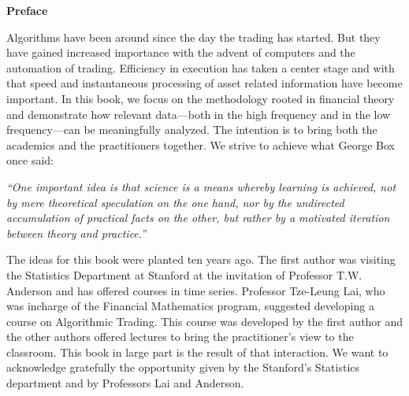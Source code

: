 \begin{center} {\large\bfseries Preface} \end{center}


Algorithms have been around since the day the trading has started. But they have gained increased importance with the advent of computers and the automation of trading. Efficiency in execution has taken a center stage and with that speed and instantaneous processing of asset related information have become important. In this book, we focus on the methodology rooted in financial theory and demonstrate how relevant data---both in the high frequency and in the low frequency---can be meaningfully analyzed. The intention is to bring both the academics and the practitioners together. We strive to achieve what George Box once said: \par
        \begin{center}
        \begin{minipage}[t]{0.7\textwidth}
        	\raggedright
          	{\itshape``One important idea is that science is a means whereby learning is achieved, not by mere theoretical speculation on the one hand, nor by the undirected accumulation of practical facts on the other, but rather by a motivated iteration between theory and practice.''}
        \end{minipage} 
        \end{center}


The ideas for this book were planted ten years ago. The first author was visiting the Statistics Department at Stanford at the invitation of Professor T.W. Anderson and has offered courses in time series. Professor Tze-Leung Lai, who was incharge of the Financial Mathematics program, suggested developing a course on Algorithmic Trading. This course was developed by the first author and the other authors offered lectures to bring the practitioner's view to the classroom. This book in large part is the result of that interaction. We want to acknowledge gratefully the opportunity given by the Stanford's Statistics department and by Professors Lai and Anderson. 


